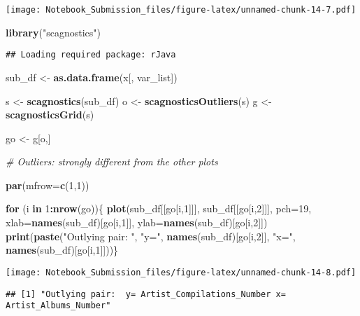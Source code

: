 \documentclass[
]{article}
\newenvironment{Shaded}{\begin{snugshade}}{\end{snugshade}}
\newcommand{\CommentTok}[1]{\textcolor[rgb]{0.56,0.35,0.01}{\textit{#1}}}
\newcommand{\ControlFlowTok}[1]{\textcolor[rgb]{0.13,0.29,0.53}{\textbf{#1}}}
\newcommand{\DataTypeTok}[1]{\textcolor[rgb]{0.13,0.29,0.53}{#1}}
\newcommand{\DecValTok}[1]{\textcolor[rgb]{0.00,0.00,0.81}{#1}}
\newcommand{\KeywordTok}[1]{\textcolor[rgb]{0.13,0.29,0.53}{\textbf{#1}}}
\newcommand{\NormalTok}[1]{#1}
\newcommand{\OperatorTok}[1]{\textcolor[rgb]{0.81,0.36,0.00}{\textbf{#1}}}
\newcommand{\StringTok}[1]{\textcolor[rgb]{0.31,0.60,0.02}{#1}}
\begin{document}
\texttt{[image: Notebook\_Submission\_files/figure-latex/unnamed-chunk-14-7.pdf]}

\begin{Shaded}
\begin{Highlighting}[]
\KeywordTok{library}\NormalTok{(}\StringTok{"scagnostics"}\NormalTok{)}
\end{Highlighting}
\end{Shaded}

\begin{verbatim}
## Loading required package: rJava
\end{verbatim}

\begin{Shaded}
\begin{Highlighting}[]
\NormalTok{sub_df <-}\StringTok{ }\KeywordTok{as.data.frame}\NormalTok{(x[, var_list])}

\NormalTok{s <-}\StringTok{ }\KeywordTok{scagnostics}\NormalTok{(sub_df)}
\NormalTok{o <-}\StringTok{ }\KeywordTok{scagnosticsOutliers}\NormalTok{(s)}
\NormalTok{g <-}\StringTok{ }\KeywordTok{scagnosticsGrid}\NormalTok{(s)}

\NormalTok{go <-}\StringTok{ }\NormalTok{g[o,]}

\CommentTok{# Outliers: strongly different from the other plots}

\KeywordTok{par}\NormalTok{(}\DataTypeTok{mfrow=}\KeywordTok{c}\NormalTok{(}\DecValTok{1}\NormalTok{,}\DecValTok{1}\NormalTok{))}

\ControlFlowTok{for}\NormalTok{ (i }\ControlFlowTok{in} \DecValTok{1}\OperatorTok{:}\KeywordTok{nrow}\NormalTok{(go))\{}
\KeywordTok{plot}\NormalTok{(sub_df[[go[i,}\DecValTok{1}\NormalTok{]]], sub_df[[go[i,}\DecValTok{2}\NormalTok{]]], }\DataTypeTok{pch=}\DecValTok{19}\NormalTok{, }\DataTypeTok{xlab=}\KeywordTok{names}\NormalTok{(sub_df)[go[i,}\DecValTok{1}\NormalTok{]], }\DataTypeTok{ylab=}\KeywordTok{names}\NormalTok{(sub_df)[go[i,}\DecValTok{2}\NormalTok{]])}
\KeywordTok{print}\NormalTok{(}\KeywordTok{paste}\NormalTok{(}\StringTok{"Outlying pair: "}\NormalTok{, }\StringTok{"y="}\NormalTok{, }\KeywordTok{names}\NormalTok{(sub_df)[go[i,}\DecValTok{2}\NormalTok{]], }\StringTok{"x="}\NormalTok{, }\KeywordTok{names}\NormalTok{(sub_df)[go[i,}\DecValTok{1}\NormalTok{]]))\}}
\end{Highlighting}
\end{Shaded}

\texttt{[image: Notebook\_Submission\_files/figure-latex/unnamed-chunk-14-8.pdf]}

\begin{verbatim}
## [1] "Outlying pair:  y= Artist_Compilations_Number x= Artist_Albums_Number"
\end{verbatim}
\end{document}
